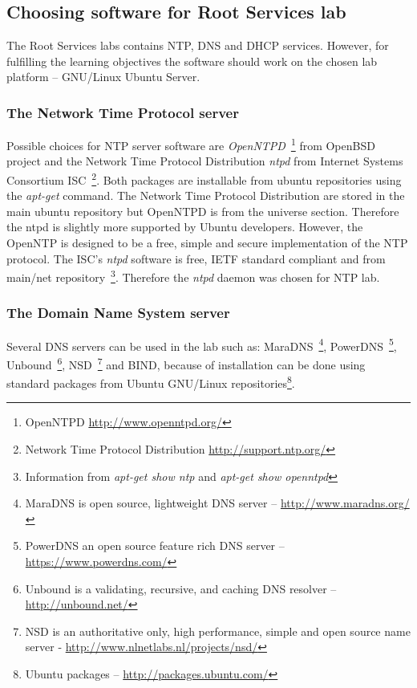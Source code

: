 \subsection{Choosing software for Root Services lab}
The Root Services labs contains \gls{NTP}, \gls{DNS} and \gls{DHCP} services. However, for fulfilling the learning objectives the software should work on the chosen lab platform -- GNU/Linux Ubuntu Server. 

\subsubsection{The Network Time Protocol server}
Possible choices for \gls{NTP} server software are \emph{OpenNTPD}~\footnote{OpenNTPD \url{http://www.openntpd.org/}
} from OpenBSD  project and the Network Time Protocol Distribution \emph{ntpd} from  Internet Systems Consortium \gls{ISC}~\footnote{Network Time Protocol Distribution \url{http://support.ntp.org/}}. Both packages are installable from ubuntu repositories using the \emph{apt-get} command. The Network Time Protocol Distribution are stored in the main ubuntu repository but OpenNTPD is from the universe section. Therefore the \gls{ntpd} is  slightly more supported by Ubuntu developers.
However, the OpenNTP is designed to be a free, simple and secure implementation of the \gls{NTP} protocol. The \gls{ISC}'s \emph{ntpd} software is free, \gls{IETF} standard compliant and from main/net repository~\footnote{Information from \emph{apt-get show ntp} and \emph{apt-get show openntpd}}. Therefore the \emph{ntpd} daemon was chosen for \gls{NTP} lab.
\subsubsection{The Domain Name System server}
Several \gls{DNS} servers can be used in the lab such as: MaraDNS~\footnote{ MaraDNS is open source, lightweight \gls{DNS} server -- \url{http://www.maradns.org/}}, PowerDNS~\footnote{PowerDNS an open source feature rich \gls{DNS} server -- \url{https://www.powerdns.com/}}, Unbound~\footnote{Unbound is a validating, recursive, and caching \gls{DNS} resolver -- \url{http://unbound.net/}}, NSD~\footnote{NSD is an authoritative only, high performance, simple and open source name server - \url{http://www.nlnetlabs.nl/projects/nsd/}} and \gls{BIND}, because of installation can be done using standard packages from Ubuntu GNU/Linux repositories\footnote{Ubuntu packages --  \url{http://packages.ubuntu.com/}}.


